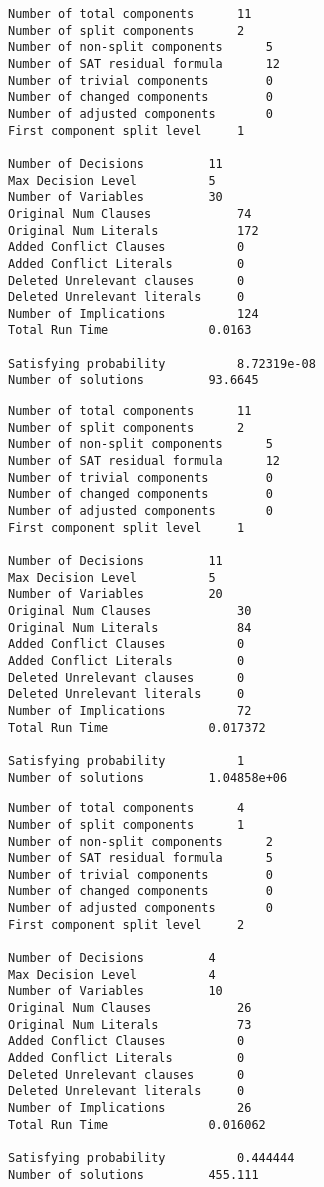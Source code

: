 \begin{lstlisting}[caption={Cachet on ENC1 encoding of Cancer network}]
Number of total components		11
Number of split components		2
Number of non-split components		5
Number of SAT residual formula		12
Number of trivial components		0
Number of changed components		0
Number of adjusted components		0
First component split level		1

Number of Decisions			11
Max Decision Level			5
Number of Variables			30
Original Num Clauses			74
Original Num Literals			172
Added Conflict Clauses			0
Added Conflict Literals			0
Deleted Unrelevant clauses		0
Deleted Unrelevant literals		0
Number of Implications			124
Total Run Time				0.0163

Satisfying probability			8.72319e-08
Number of solutions			93.6645

\end{lstlisting}

\begin{lstlisting}[caption={Cachet on ENC2 encoding of Cancer network}]
Number of total components		11
Number of split components		2
Number of non-split components		5
Number of SAT residual formula		12
Number of trivial components		0
Number of changed components		0
Number of adjusted components		0
First component split level		1

Number of Decisions			11
Max Decision Level			5
Number of Variables			20
Original Num Clauses			30
Original Num Literals			84
Added Conflict Clauses			0
Added Conflict Literals			0
Deleted Unrelevant clauses		0
Deleted Unrelevant literals		0
Number of Implications			72
Total Run Time				0.017372

Satisfying probability			1
Number of solutions			1.04858e+06

\end{lstlisting}

\begin{lstlisting}[caption={Cachet on WCNF encoding of Monty Hall}]
Number of total components		4
Number of split components		1
Number of non-split components		2
Number of SAT residual formula		5
Number of trivial components		0
Number of changed components		0
Number of adjusted components		0
First component split level		2

Number of Decisions			4
Max Decision Level			4
Number of Variables			10
Original Num Clauses			26
Original Num Literals			73
Added Conflict Clauses			0
Added Conflict Literals			0
Deleted Unrelevant clauses		0
Deleted Unrelevant literals		0
Number of Implications			26
Total Run Time				0.016062

Satisfying probability			0.444444
Number of solutions			455.111
\end{lstlisting}


